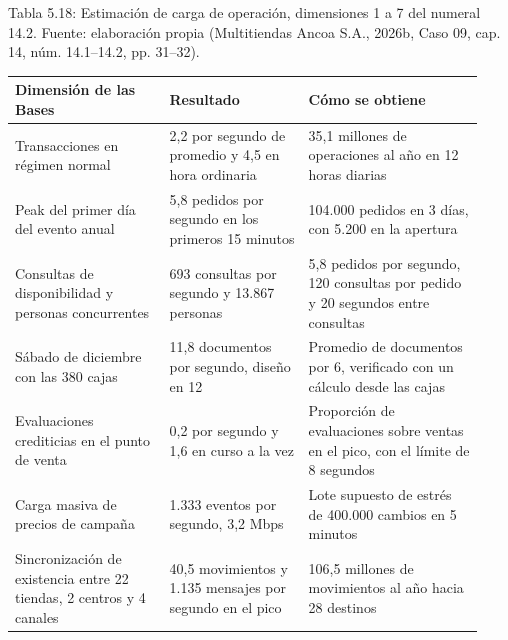 \documentclass[11pt]{article}
\begin{document}
\par\vspace{0.6\baselineskip}\noindent\begin{minipage}{\linewidth}
Tabla 5.18: Estimación de carga de operación, dimensiones 1 a 7 del numeral 14.2. Fuente: elaboración propia (Multitiendas Ancoa S.A., 2026b, Caso 09, cap. 14, núm. 14.1–14.2, pp. 31–32).\label{tab:t23}\par\vspace{0.3\baselineskip}
\begin{tabular}{@{}p{0.303\linewidth}p{0.275\linewidth}p{0.348\linewidth}@{}}
\toprule Dimensión de las Bases & Resultado & Cómo se obtiene \\
\midrule
Transacciones en régimen normal & 2,2 por segundo de promedio y 4,5 en hora ordinaria & 35,1 millones de operaciones al año en 12 horas diarias \\
Peak del primer día del evento anual & 5,8 pedidos por segundo en los primeros 15 minutos & 104.000 pedidos en 3 días, con 5.200 en la apertura \\
Consultas de disponibilidad y personas concurrentes & 693 consultas por segundo y 13.867 personas & 5,8 pedidos por segundo, 120 consultas por pedido y 20 segundos entre consultas \\
Sábado de diciembre con las 380 cajas & 11,8 documentos por segundo, diseño en 12 & Promedio de documentos por 6, verificado con un cálculo desde las cajas \\
Evaluaciones crediticias en el punto de venta & 0,2 por segundo y 1,6 en curso a la vez & Proporción de evaluaciones sobre ventas en el pico, con el límite de 8 segundos \\
Carga masiva de precios de campaña & 1.333 eventos por segundo, 3,2 Mbps & Lote supuesto de estrés de 400.000 cambios en 5 minutos \\
Sincronización de existencia entre 22 tiendas, 2 centros y 4 canales & 40,5 movimientos y 1.135 mensajes por segundo en el pico & 106,5 millones de movimientos al año hacia 28 destinos \\
\bottomrule
\end{tabular}
\end{minipage}
\par
\end{document}
